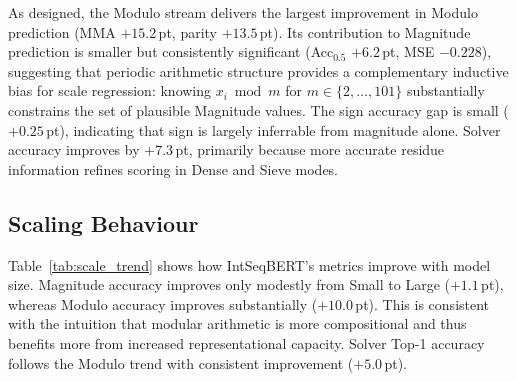 As designed, the Modulo stream delivers the largest improvement in Modulo prediction (MMA
$+15.2$\,pt, parity $+13.5$\,pt). Its contribution to Magnitude prediction is smaller but
consistently significant (Acc$_{0.5}$ $+6.2$\,pt, MSE $-0.228$), suggesting that periodic
arithmetic structure provides a complementary inductive bias for scale regression: knowing
$x_i \bmod m$ for $m \in \{2, \ldots, 101\}$ substantially constrains the set of plausible
Magnitude values. The sign accuracy gap is small ($+0.25$\,pt), indicating that sign is largely
inferrable from magnitude alone. Solver accuracy improves by $+7.3$\,pt, primarily because
more accurate residue information refines scoring in Dense and Sieve modes.

\subsection{Scaling Behaviour}
\label{sec:scaling}

Table~\ref{tab:scale_trend} shows how IntSeqBERT's metrics improve with model size.
Magnitude accuracy improves only modestly from Small to Large ($+1.1$\,pt), whereas Modulo
accuracy improves substantially ($+10.0$\,pt). This is consistent with the intuition that
modular arithmetic is more compositional and thus benefits more from increased representational
capacity. Solver Top-1 accuracy follows the Modulo trend with consistent improvement ($+5.0$\,pt).

